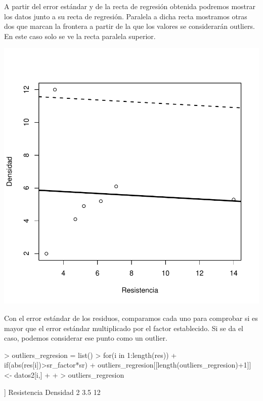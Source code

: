 \documentclass [a4paper] {article}
\begin{document}
A partir del error estándar y de la recta de regresión obtenida podremos mostrar los datos junto a su recta de regresión.
Paralela a dicha recta mostramos otras dos que marcan la frontera a partir de la que los valores se considerarán outliers.
En este caso solo se ve la recta paralela superior.
\begin{center}
\includegraphics{entrega-regresion_plot}
\end{center}

Con el error estándar de los residuos, comparamos cada uno para comprobar si es mayor que el error estándar multiplicado por el factor establecido.
Si se da el caso, podemos considerar ese punto como un outlier.
\begin{Schunk}
\begin{Sinput}
> outliers_regresion = list()
> for(i in 1:length(res)){
+   if(abs(res[i])>sr_factor*sr){
+     outliers_regresion[[length(outliers_regresion)+1]] <- datos2[i,]
+   }
+ }
> outliers_regresion
\end{Sinput}
\begin{Soutput}
[[1]]
  Resistencia Densidad
2         3.5       12
\end{Soutput}
\end{Schunk}
\end{document}
